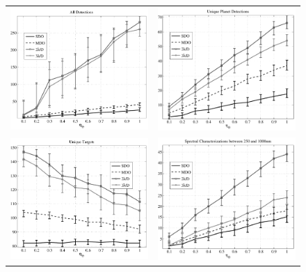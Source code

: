 \begin{figure}[ht]
 \begin{center}
  \begin{tabular}{c c}
   \includegraphics[width=2.9in]{./figures/c8m_ADETs} &
   \includegraphics[width=2.9in]{./figures/c8m_AuDETs} \\
   \includegraphics[width=2.9in]{./figures/c8m_Auvisits} &
   \includegraphics[width=2.9in]{./figures/c8m_ASPECTRA}

\end{tabular}
\end{center}
\end{figure}
